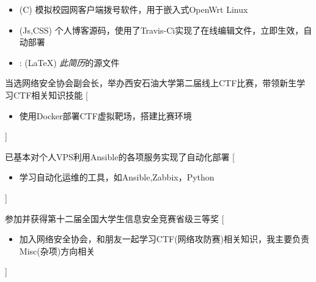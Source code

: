 \documentclass[zh]{resume}
\begin{document}
\begin{itemize}
  \item {}
  (C)
  模拟校园网客户端拨号软件，用于嵌入式OpenWrt Linux
  \item {}
  (Js,CSS)
  个人博客源码，使用了Travis-Ci实现了在线编辑文件，立即生效，自动部署
  \item {}:
    (\LaTeX)
    \emph{此简历}的源文件
\end{itemize}


\begin{experiences}
  {当选网络安全协会副会长，举办西安石油大学第二届线上CTF比赛，带领新生学习CTF相关知识技能}%
  [\begin{itemize}
    \item 使用Docker部署CTF虚拟靶场，搭建比赛环境
  \end{itemize}
  ]

  \separator{0.5ex}
  {已基本对个人VPS利用Ansible的各项服务实现了自动化部署 }%
  [\begin{itemize}
    \item 学习自动化运维的工具，如Ansible,Zabbix，Python
  \end{itemize}
  ]
  
  \separator{0.5ex}
  {参加并获得第十二届全国大学生信息安全竞赛省级三等奖}%
  [\begin{itemize}
    \item 加入网络安全协会，和朋友一起学习CTF(网络攻防赛)相关知识，我主要负责Misc(杂项)方向相关
  \end{itemize}
  ]


\end{experiences}
\end{document}
